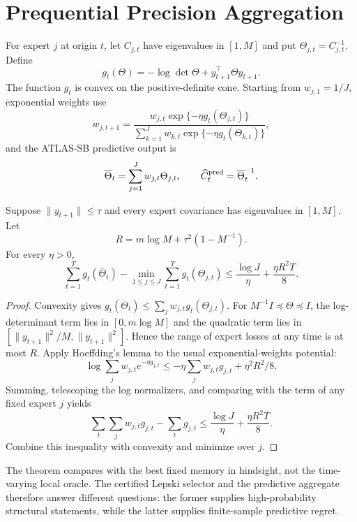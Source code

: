 \section{Prequential Precision Aggregation}
\label{app:aggregation}

For expert $j$ at origin $t$, let $C_{j,t}$ have eigenvalues in $[1,M]$ and put $\Theta_{j,t}=C_{j,t}^{-1}$.  Define
\begin{equation}
 g_t(\Theta)=-\log\det\Theta+y_{t+1}^\top\Theta y_{t+1}.
\end{equation}
The function $g_t$ is convex on the positive-definite cone.  Starting from $w_{j,1}=1/J$, exponential weights use
\begin{equation}
 w_{j,t+1}=\frac{w_{j,t}\exp\{-\eta g_t(\Theta_{j,t})\}}
 {\sum_{k=1}^Jw_{k,t}\exp\{-\eta g_t(\Theta_{k,t})\}},
\end{equation}
and the ATLAS-SB predictive output is
\begin{equation}
 \overline\Theta_t=\sum_{j=1}^Jw_{j,t}\Theta_{j,t},\qquad
 \widehat C_t^{\rm pred}=\overline\Theta_t^{-1}.
\end{equation}

\begin{theorem}
\label{thm:aggregation-app}
Suppose $\|y_{t+1}\|\le\tau$ and every expert covariance has eigenvalues in $[1,M]$.  Let
\begin{equation}
 R=m\log M+\tau^2(1-M^{-1}).
\end{equation}
For every $\eta>0$,
\begin{equation}
 \sum_{t=1}^T g_t(\overline\Theta_t)
 -\min_{1\le j\le J}\sum_{t=1}^T g_t(\Theta_{j,t})
 \le \frac{\log J}{\eta}+\frac{\eta R^2T}{8}.
 \label{eq:aggregation-regret-app}
\end{equation}
\end{theorem}

\begin{proof}
Convexity gives
$g_t(\overline\Theta_t)\le\sum_jw_{j,t}g_t(\Theta_{j,t})$.
For $M^{-1}I\preceq\Theta\preceq I$, the log-determinant term lies in $[0,m\log M]$ and the quadratic term lies in
$[\|y_{t+1}\|^2/M,\|y_{t+1}\|^2]$.  Hence the range of expert losses at any time is at most $R$.  Apply Hoeffding's lemma to the usual exponential-weights potential:
\begin{equation}
 \log\sum_jw_{j,t}e^{-\eta g_{j,t}}
 \le-\eta\sum_jw_{j,t}g_{j,t}+\eta^2R^2/8.
\end{equation}
Summing, telescoping the log normalizers, and comparing with the term of any fixed expert $j$ yields
\begin{equation}
 \sum_t\sum_jw_{j,t}g_{j,t}-\sum_tg_{j,t}
 \le\frac{\log J}{\eta}+\frac{\eta R^2T}{8}.
\end{equation}
Combine this inequality with convexity and minimize over $j$.  \end{proof}

The theorem compares with the best fixed memory in hindsight, not the time-varying local oracle.  The certified Lepski selector and the predictive aggregate therefore answer different questions: the former supplies high-probability structural statements, while the latter supplies finite-sample predictive regret.
